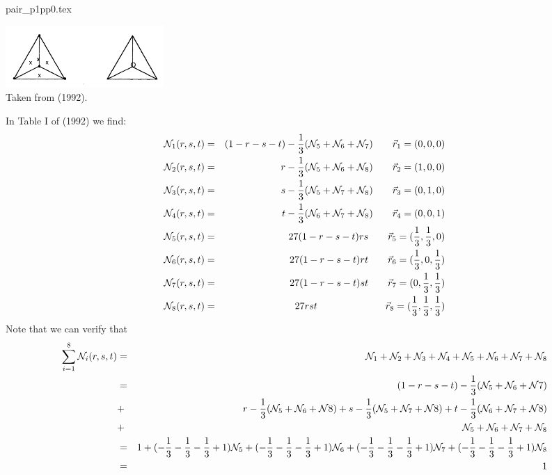 \begin{flushright} {\tiny {\color{gray} pair\_p1pp0.tex}} \end{flushright}

\begin{center}
\includegraphics[width=6cm]{images/pair_p1pp0/p1pp0}\\
{\captionfont Taken from \textcite{begt92} (1992).}
\end{center}

In Table I of \textcite{begt92} (1992) we find:
\begin{eqnarray}
{\mathcal{N}}_1(r,s,t) &=& (1-r-s-t)-\frac13 ({\mathcal{N}}_5+{\mathcal{N}}_6+{\mathcal{N}}_7) \qquad \vec{r}_1=(0,0,0) \nonumber\\
{\mathcal{N}}_2(r,s,t) &=& r-\frac13 ({\mathcal{N}}_5+{\mathcal{N}}_6+{\mathcal{N}}_8)         \qquad \vec{r}_2=(1,0,0) \nonumber\\
{\mathcal{N}}_3(r,s,t) &=& s-\frac13 ({\mathcal{N}}_5+{\mathcal{N}}_7+{\mathcal{N}}_8)         \qquad \vec{r}_3=(0,1,0) \nonumber\\
{\mathcal{N}}_4(r,s,t) &=& t-\frac13 ({\mathcal{N}}_6+{\mathcal{N}}_7+{\mathcal{N}}_8)         \qquad \vec{r}_4=(0,0,1) \nonumber\\
{\mathcal{N}}_5(r,s,t) &=& 27(1-r-s-t)rs          \qquad \vec{r}_5=(\frac13,\frac13,0) \nonumber\\
{\mathcal{N}}_6(r,s,t) &=& 27(1-r-s-t)rt          \qquad \vec{r}_6=(\frac13,0,\frac13) \nonumber\\
{\mathcal{N}}_7(r,s,t) &=& 27(1-r-s-t)st          \qquad \vec{r}_7=(0,\frac13,\frac13) \nonumber\\
{\mathcal{N}}_8(r,s,t) &=& 27rst  \qquad\qquad\qquad\quad \vec{r}_8=(\frac13,\frac13,\frac13) 
\end{eqnarray}
Note that we can verify that
\begin{eqnarray}
\sum_{i=1}^8 {\mathcal{N}}_i(r,s,t) 
&=& {\mathcal{N}}_1 +{\mathcal{N}}_2 +{\mathcal{N}}_3 +{\mathcal{N}}_4 +{\mathcal{N}}_5 +{\mathcal{N}}_6 +{\mathcal{N}}_7 +{\mathcal{N}}_8 \nonumber\\
&=& (1-r-s-t)-\frac13 ({\mathcal{N}}_5+{\mathcal{N}}_6+{\mathcal{N}}7) \nonumber\\
&+& r-\frac13 ({\mathcal{N}}_5+{\mathcal{N}}_6+{\mathcal{N}}8)  
 +  s-\frac13 ({\mathcal{N}}_5+{\mathcal{N}}_7+{\mathcal{N}}8) 
 +  t-\frac13 ({\mathcal{N}}_6+{\mathcal{N}}_7+{\mathcal{N}}8) \nonumber\\
&+& {\mathcal{N}}_5 + {\mathcal{N}}_6 + {\mathcal{N}}_7 + {\mathcal{N}}_8  \nonumber\\
&=& 1
+(-\frac13 -\frac13 -\frac13+1){\mathcal{N}}_5
+(-\frac13 -\frac13 -\frac13+1){\mathcal{N}}_6
+(-\frac13 -\frac13 -\frac13+1){\mathcal{N}}_7
+(-\frac13 -\frac13 -\frac13+1){\mathcal{N}}_8 \nonumber\\
&=& 1
\end{eqnarray}




